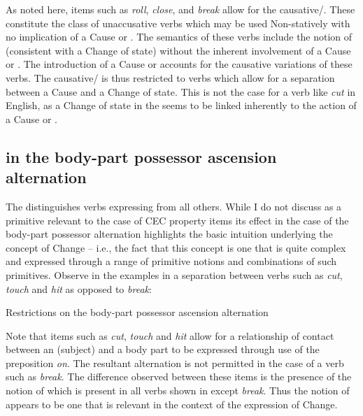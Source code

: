 As noted here, items such as \textit{roll}, \textit{close},  and \textit{break} allow for the
causative\slash {}.  These constitute the class of
unaccusative verbs which may be used Non-statively with no implication
of a Cause or .  The semantics of these verbs include the notion
of \BECOME (consistent with a Change of state) without the inherent
involvement of a Cause or .  The introduction of a Cause or 
accounts for the causative variations of these verbs.  The
causative\slash {} is thus restricted to verbs which allow
for a separation between a Cause and a Change of state.  This is not
the case for a verb like \textit{cut} in English, as a Change of state in the
 seems to be linked inherently to the action of a
Cause or .


\subsection{\CONTACT in the body-part possessor ascension
  alternation}\label{sec:4.4.2}

The  distinguishes verbs
expressing \CONTACT from all others.  While I do not discuss \CONTACT as
a primitive relevant to the case of CEC property items its effect in
the case of the body-part possessor alternation highlights the basic
intuition underlying the concept of Change -- i.e., the fact that this
concept is one that is quite complex and expressed through a range of
primitive notions and combinations of such primitives.  Observe in the
examples in  a separation between verbs such as \textit{cut},
\textit{touch} and \textit{hit} as opposed to \textit{break}:

\ea\label{ex:4:17}Restrictions on the body-part possessor ascension
alternation \citep[7]{Levin1993}

\z \z

Note that items such as \textit{cut}, \textit{touch} and \textit{hit} allow for a
relationship of contact between an  (subject) and a body part to
be expressed through use of the preposition \textit{on}.  The resultant
alternation is not permitted in the case of a verb such as \textit{break}.
The difference observed between these items is the presence of the
notion of \CONTACT which is present in all verbs shown in 
except \textit{break}.  Thus the notion of \CONTACT appears to be one that is
relevant in the context of the expression of Change.

